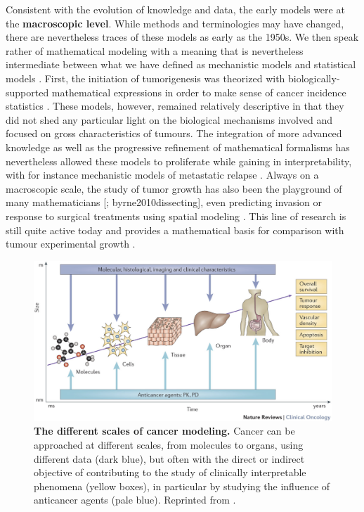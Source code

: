 \documentclass[a4paper,12pt,twoside,onecolumn,openright,final,oldfontcommands]{memoir}
\begin{document}
Consistent with the evolution of knowledge and data, the early models
were at the \textbf{macroscopic level}. While methods and terminologies
may have changed, there are nevertheless traces of these models as early
as the 1950s. We then speak rather of mathematical modeling with a
meaning that is nevertheless intermediate between what we have defined
as mechanistic models and statistical models
\citep{byrne2010dissecting}. First, the initiation of tumorigenesis was
theorized with biologically-supported mathematical expressions in order
to make sense of cancer incidence statistics
\citep[\citet{knudson1971mutation}]{armitage1954age}. These models,
however, remained relatively descriptive in that they did not shed any
particular light on the biological mechanisms involved and focused on
gross characteristics of tumours. The integration of more advanced
knowledge as well as the progressive refinement of mathematical
formalisms has nevertheless allowed these models to proliferate while
gaining in interpretability, with for instance mechanistic models of
metastatic relapse \citep{nicolo2020machine}. Always on a macroscopic
scale, the study of tumor growth has also been the playground of many
mathematicians {[}\citet{araujo2004history}; byrne2010dissecting{]},
even predicting invasion or response to surgical treatments using
spatial modeling \citep{swanson2003virtual}. This line of research is
still quite active today and provides a mathematical basis for
comparison with tumour experimental growth
\citep{benzekry2014classical}.

\begin{figure}

{\centering \includegraphics[width=0.9\linewidth]{fig/multiscale} 

}

\caption[The different scales of cancer modeling]{\textbf{The different scales of cancer
modeling.} Cancer can be approached at different scales, from molecules
to organs, using different data (dark blue), but often with the direct
or indirect objective of contributing to the study of clinically
interpretable phenomena (yellow boxes), in particular by studying the
influence of anticancer agents (pale blue). Reprinted from
\citet{barbolosi2016computational}.}\label{fig:multiscale}
\end{figure}
\end{document}
